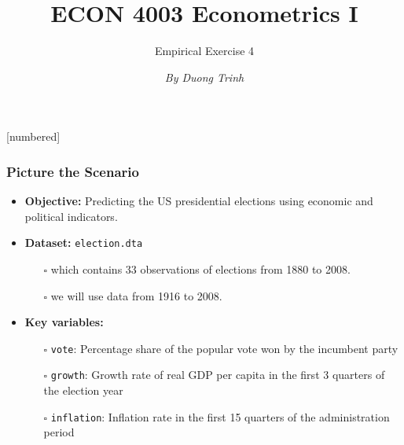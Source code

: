 \documentclass[11pt, xcolor=x11names,compress]{beamer}
\title [ECON 4003: Empirical Exercise 4]{ECON 4003 Econometrics I}
\author[]{Empirical Exercise 4}
\date[]{\textit{By Duong Trinh}}
\begin{document}
[numbered]
{
\frame{\titlepage}}


\begin{frame}[fragile,t]
\linespread{1.3}
\frametitle{Picture the Scenario}
\begin{itemize}
    \item \textbf{Objective:} Predicting the US presidential elections using economic and political indicators.
    \item \textbf{Dataset:} \texttt{election.dta} 
    \begin{itemize}
        \item [$\square$] which contains 33 observations of elections from 1880 to 2008.
        \item [$\square$] we will use data from 1916 to 2008.
    \end{itemize}
    \item \textbf{Key variables:}
    \begin{itemize}
        \item [$\square$] \texttt{vote}: Percentage share of the popular vote won by the incumbent party
        \item [$\square$] \texttt{growth}: Growth rate of real GDP per capita in the first 3 quarters of the election year
        \item [$\square$] \texttt{inflation}: Inflation rate in the first 15 quarters of the administration period
    \end{itemize}
\end{itemize}
\end{frame}
\end{document}
